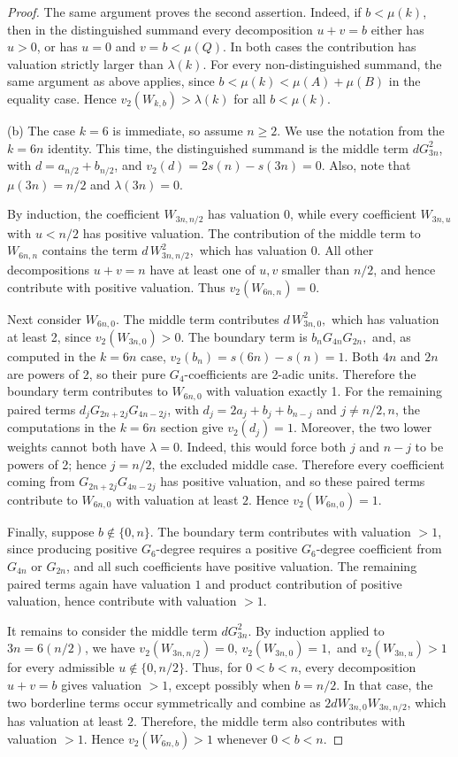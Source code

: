 \documentclass[12pt]{amsart}
\begin{document}
\begin{proof}
The same argument proves the second assertion.  Indeed, if $b<\mu(k)$, then in the distinguished summand every decomposition $u+v=b$ either has $u>0$, or has $u=0$ and $v=b<\mu(Q)$.  In both cases the contribution has valuation strictly larger than $\lambda(k)$.  For every non-distinguished summand, the same argument as above applies, since $ b<\mu(k)<\mu(A)+\mu(B) $ in the equality case.  Hence $v_2(W_{k,b})>\lambda(k) $ for all \(b<\mu(k)\).

\bigskip

(b) The case $k=6$ is immediate, so assume $n\ge 2$. We use the notation from the $k=6n$ identity. This time, the distinguished summand is the middle term $ dG_{3n}^2$, with $d=a_{n/2}+b_{n/2}$, and $v_2(d)=2s(n)-s(3n)=0.$ Also, note that $\mu(3n)=n/2$ and $\lambda(3n)=0.$

By induction, the coefficient $W_{3n,n/2}$ has valuation 0, while every coefficient $W_{3n,u}$ with $u<n/2$ has positive valuation. The contribution of the middle term to $W_{6n,n}$ contains the term $d\,W_{3n,n/2}^2,$ which has valuation 0. All other decompositions $u+v=n$ have at least one of $u,v$ smaller than $n/2$, and hence contribute with positive valuation.  Thus $v_2(W_{6n,n})=0.$

Next consider $W_{6n,0}$.  The middle term contributes $ d\,W_{3n,0}^2,$ which has valuation at least 2, since $v_2(W_{3n,0})>0$.  The boundary term is $b_nG_{4n}G_{2n},$ and, as computed in the $k=6n$ case, $v_2(b_n)=s(6n)-s(n)=1.$ Both $4n$ and $2n$ are powers of 2, so their pure $G_4$-coefficients are 2-adic units.  Therefore the boundary term contributes to $W_{6n,0}$ with valuation exactly 1. For the remaining paired terms $d_jG_{2n+2j}G_{4n-2j}$, with  $d_j=2a_j+b_j+b_{n-j}$ and $j\neq n/2,n$, the computations in the $k=6n$ section give $v_2(d_j)=1.$ Moreover, the two lower weights cannot both have $\lambda=0$.  Indeed, this would force both $j$ and $n-j$ to be powers of 2; hence $j=n/2$, the excluded middle case.  Therefore every coefficient coming from $G_{2n+2j}G_{4n-2j}$ has positive valuation, and so these paired terms contribute to \(W_{6n,0}\) with valuation at least \(2\). Hence $v_2(W_{6n,0})=1.$

Finally, suppose $b\notin\{0,n\}$. The boundary term contributes with valuation $>1$, since producing positive $G_6$-degree requires a positive $G_6$-degree coefficient from $G_{4n}$ or $G_{2n}$, and all such coefficients have positive valuation. The remaining paired terms again have valuation $1$ and product contribution of positive valuation, hence contribute with valuation $>1$. 

It remains to consider the middle term $dG_{3n}^2$. By induction applied to
$3n=6(n/2)$, we have $v_2(W_{3n,n/2})=0$, $v_2(W_{3n,0})=1,$ and $v_2(W_{3n,u})>1$ for every admissible $u\notin\{0,n/2\}$. Thus, for $0<b<n$, every decomposition $u+v=b$ gives valuation $>1$, except possibly when $b=n/2$. In that case, the two borderline terms occur symmetrically and
combine as $2dW_{3n,0}W_{3n,n/2}$, which has valuation at least $2$. Therefore, the middle term also contributes
with valuation $>1$. Hence $v_2(W_{6n,b})>1$ whenever $0<b<n$.

\end{proof}
\end{document}
